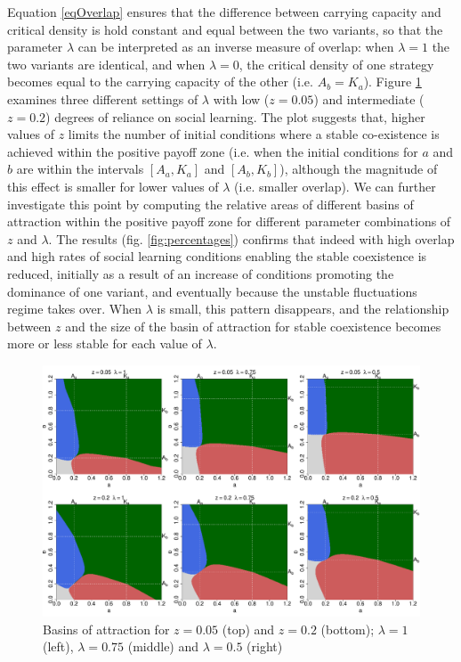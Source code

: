 \documentclass[review,authoryear]{elsarticle}
\begin{document}
Equation \eqref{eqOverlap} ensures that the difference between carrying capacity and critical density is hold constant and equal between the two variants, so that the parameter $\lambda$ can be interpreted as an inverse  measure of overlap: when $\lambda=1$ the two variants are identical, and when $\lambda=0$, the critical density of one strategy becomes equal to the carrying capacity of the other (i.e. $A_b=K_a$). Figure \ref{fig:overlap} examines three different settings of $\lambda$  with low ($z=0.05$) and intermediate ($z=0.2$) degrees of reliance on social learning. The plot suggests that, higher values of $z$ limits the number of initial conditions where a stable co-existence is achieved within the positive payoff zone (i.e. when the initial conditions for $a$ and $b$ are within the intervals $[A_a,K_a]$ and $[A_b,K_b]$), although the magnitude of this effect is smaller for lower values of $\lambda$ (i.e. smaller overlap). We can further investigate this point by computing the relative areas of different basins of attraction within the positive payoff zone for different parameter combinations of $z$ and $\lambda$. The results (fig. \ref{fig:percentages}) confirms that indeed with high overlap and high rates of social learning conditions enabling the stable coexistence is reduced, initially as a result of an increase of conditions promoting the dominance of one variant, and eventually because the unstable fluctuations regime takes over. When  $\lambda$ is small, this pattern disappears, and the relationship between $z$ and the size of the basin of attraction for stable coexistence becomes more or less stable for each value of $\lambda$. 

\begin{figure}
  \centering
      \includegraphics[width=\textwidth]{./figures/figure5}
  \caption{Basins of attraction for $z=0.05$ (top) and $z=0.2$ (bottom); $\lambda=1$ (left), $\lambda=0.75$ (middle) and $\lambda=0.5$ (right)}
    \label{fig:overlap}
\end{figure}
\end{document}
